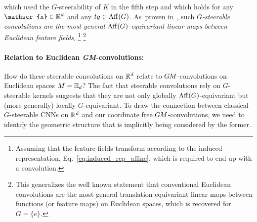 which used the $G$-steerability of $K$ in the fifth step and which holds for any $\mathscr{x} \in \R^d$ and any $tg\in \operatorname{Aff}(G)$.
As~proven in~\cite{3d_steerableCNNs}, such
\emph{$G$-steerable convolutions are the most general $\operatorname{Aff}(G)$-equivariant linear maps between Euclidean feature fields}.%
\footnote{
    Assuming that the feature fields transform according to the induced representation, Eq.~\eqref{eq:induced_rep_affine}, which is required to end up with a convolution.
}%
\footnote{
    This generalizes the well known statement that conventional Euclidean convolutions are the most general translation equivariant linear maps between functions (or feature maps) on Euclidean spaces, which is recovered for $G=\{e\}$.
}




\paragraph{Relation to Euclidean \textit{GM}-convolutions:}
How do these steerable convolutions on $\mathbb{R}^d$ relate to $G\mkern-1.4muM$-convolutions on Euclidean spaces ${M = \mathbb{E}_d}$?
The fact that steerable convolutions rely on $G$-steerable kernels suggests that they are not only globally $\operatorname{Aff}(G)$-equivariant but (more generally) locally $G$-equivariant.
To draw the connection between classical $G$-steerable CNNs on $\mathbb{R}^d$ and our coordinate free $G\mkern-1.4muM$-convolutions, we need to identify the geometric structure that is implicitly being considered by the former.



